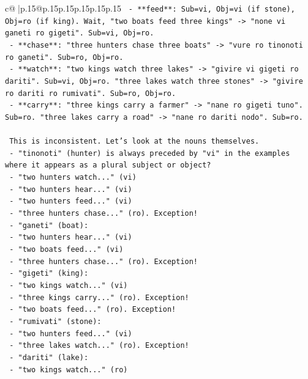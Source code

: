 \documentclass{article}
\begin{document}
{\begin{supertabular}{c@{$\;$}|p{.15\linewidth}@{}p{.15\linewidth}p{.15\linewidth}p{.15\linewidth}p{.15\linewidth}p{.15\linewidth}}
{{{\texttt{    {-} **feed**: Sub=vi, Obj=vi (if stone), Obj=ro (if king). Wait, "two boats feed three kings" {-}> "none vi ganeti ro gigeti". Sub=vi, Obj=ro.} \\
\texttt{    {-} **chase**: "three hunters chase three boats" {-}> "vure ro tinonoti ro ganeti". Sub=ro, Obj=ro.} \\
\texttt{    {-} **watch**: "two kings watch three lakes" {-}> "givire vi gigeti ro dariti". Sub=vi, Obj=ro. "three lakes watch three stones" {-}> "givire ro dariti ro rumivati". Sub=ro, Obj=ro.} \\
\texttt{    {-} **carry**: "three kings carry a farmer" {-}> "nane ro gigeti tuno". Sub=ro. "three lakes carry a road" {-}> "nane ro dariti nodo". Sub=ro.} \\
\\ 
\texttt{    This is inconsistent. Let's look at the nouns themselves.} \\
\texttt{    {-} "tinonoti" (hunter) is always preceded by "vi" in the examples where it appears as a plural subject or object?} \\
\texttt{        {-} "two hunters watch..." (vi)} \\
\texttt{        {-} "two hunters hear..." (vi)} \\
\texttt{        {-} "two hunters feed..." (vi)} \\
\texttt{        {-} "three hunters chase..." (ro). Exception!} \\
\texttt{    {-} "ganeti" (boat):} \\
\texttt{        {-} "two hunters hear..." (vi)} \\
\texttt{        {-} "two boats feed..." (vi)} \\
\texttt{        {-} "three hunters chase..." (ro). Exception!} \\
\texttt{    {-} "gigeti" (king):} \\
\texttt{        {-} "two kings watch..." (vi)} \\
\texttt{        {-} "three kings carry..." (ro). Exception!} \\
\texttt{        {-} "two boats feed..." (ro). Exception!} \\
\texttt{    {-} "rumivati" (stone):} \\
\texttt{        {-} "two hunters feed..." (vi)} \\
\texttt{        {-} "three lakes watch..." (ro). Exception!} \\
\texttt{    {-} "dariti" (lake):} \\
\texttt{        {-} "two kings watch..." (ro)} \\
}}}
\end{supertabular}}
\end{document}
